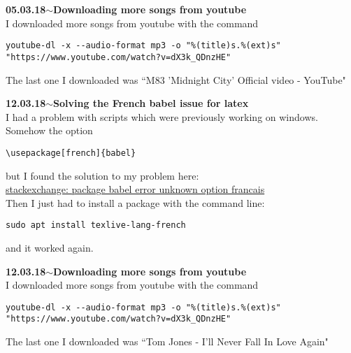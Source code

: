 \documentclass[11pt,a4paper]{article}
\newenvironment{loggentry}[2]%
{\noindent\textbf{#1}\hspace{1cm}$\mathbf{\sim}$\text{ }\textbf{#2}\\}{\vspace{0.5cm}}
\begin{document}
\begin{loggentry}{05.03.18}{Downloading more songs from youtube}
I downloaded more songs from youtube with the command
\begin{verbatim}
youtube-dl -x --audio-format mp3 -o "%(title)s.%(ext)s" "https://www.youtube.com/watch?v=dX3k_QDnzHE"
\end{verbatim}
The last one I downloaded was ``M83 'Midnight City' Official video - YouTube"
\end{loggentry}

\begin{loggentry}{12.03.18}{Solving the French babel issue for latex}
I had a problem with scripts which were previously working on windows. Somehow the option
\begin{verbatim}
\usepackage[french]{babel}
\end{verbatim}
but I found the solution to my problem here:\\
\href{https://tex.stackexchange.com/questions/139700/package-babel-error-unknown-option-francais}{stackexchange: package babel error unknown option francais}\\
Then I just had to install a package with the command line:\\
\begin{verbatim}
sudo apt install texlive-lang-french
\end{verbatim}
and it worked again.
\end{loggentry}

\begin{loggentry}{12.03.18}{Downloading more songs from youtube}
I downloaded more songs from youtube with the command
\begin{verbatim}
youtube-dl -x --audio-format mp3 -o "%(title)s.%(ext)s" "https://www.youtube.com/watch?v=dX3k_QDnzHE"
\end{verbatim}
The last one I downloaded was ``Tom Jones - I'll Never Fall In Love Again"
\end{loggentry}
\end{document}
